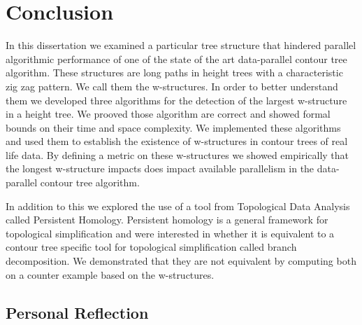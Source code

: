\chapter{Conclusion}
\label{chapter8}

In this dissertation we examined a particular tree structure that hindered parallel algorithmic performance of one of the state of the art data-parallel contour tree algorithm. These structures are long paths in height trees with a characteristic zig zag pattern. We call them the w-structures. In order to better understand them we developed three algorithms for the detection of the largest w-structure in a height tree. We prooved those algorithm are correct and showed formal bounds on their time and space complexity. We implemented these algorithms and used them to establish the existence of w-structures in contour trees of real life data. By defining a metric on these w-structures we showed empirically that the longest w-structure impacts does impact available parallelism in the data-parallel contour tree algorithm.

In addition to this we explored the use of a tool from Topological Data Analysis called Persistent Homology. Persistent homology is a general framework for topological simplification and were interested in whether it is equivalent to a contour tree specific tool for topological simplification called branch decomposition. We demonstrated that they are not equivalent by computing both on a counter example based on the w-structures.





\section{Personal Reflection}

